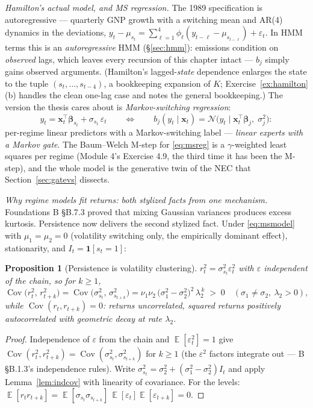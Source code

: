 \documentclass[11pt]{article}
\numberwithin{equation}{section}
\theoremstyle{plain}
\newtheorem{proposition}[theorem]{Proposition}
\theoremstyle{definition}
\theoremstyle{remark}
\DeclareMathOperator{\E}{\mathbb{E}}
\DeclareMathOperator{\Cov}{Cov}
\newcommand{\Normal}{\mathcal{N}}
\newcommand{\x}{\bm{x}}
\newcommand{\T}{\top}
\newcommand{\resp}{\gamma}
\begin{document}
\emph{Hamilton's actual model, and MS regression.} The 1989 specification is autoregressive --- quarterly GNP growth with a switching mean and AR(4) dynamics in the deviations, $y_t - \mu_{s_t} = \sum_{\ell=1}^{4} \phi_\ell (y_{t-\ell} - \mu_{s_{t-\ell}}) + \varepsilon_t$. In HMM terms this is an \emph{autoregressive} HMM (\S\ref{sec:hmm}): emissions condition on \emph{observed} lags, which leaves every recursion of this chapter intact --- $b_j$ simply gains observed arguments. (Hamilton's lagged-\emph{state} dependence enlarges the state to the tuple $(s_t, \dots, s_{t-4})$, a bookkeeping expansion of $K$; Exercise~\ref{ex:hamilton}(b) handles the clean one-lag case and notes the general bookkeeping.) The version the thesis cares about is \emph{Markov-switching regression}:
\begin{equation}
y_t = \x_t^\T \bm\beta_{s_t} + \sigma_{s_t}\, \varepsilon_t
\qquad\Longleftrightarrow\qquad
b_j(y_t \mid \x_t) = \Normal\big(y_t \mid \x_t^\T \bm\beta_j,\; \sigma_j^2\big):
\label{eq:msreg}
\end{equation}
per-regime linear predictors with a Markov-switching label --- \emph{linear experts with a Markov gate}. The Baum--Welch M-step for \eqref{eq:msreg} is a $\resp$-weighted least squares per regime (Module 4's Exercise 4.9, the third time it has been the M-step), and the whole model is the generative twin of the NEC that Section~\ref{sec:gatevs} dissects.

\emph{Why regime models fit returns: both stylized facts from one mechanism.} Foundations B \S B.7.3 proved that mixing Gaussian variances produces excess kurtosis. Persistence now delivers the second stylized fact. Under \eqref{eq:msmodel} with $\mu_1 = \mu_2 = 0$ (volatility switching only, the empirically dominant effect), stationarity, and $I_t = \mathbf{1}[s_t = 1]$:

\begin{proposition}[Persistence is volatility clustering]\label{prop:volclust}
$r_t^2 = \sigma_{s_t}^2 \varepsilon_t^2$ with $\varepsilon$ independent of the chain, so for $k \ge 1$,
\[
\Cov\big(r_t^2,\, r_{t+k}^2\big)
= \Cov\big(\sigma_{s_t}^2,\, \sigma_{s_{t+k}}^2\big)
= \nu_1 \nu_2\, \big(\sigma_1^2 - \sigma_2^2\big)^2\, \lambda_2^{\,k}
\;>\; 0
\quad (\sigma_1 \ne \sigma_2,\ \lambda_2 > 0),
\]
while $\Cov(r_t, r_{t+k}) = 0$: returns uncorrelated, squared returns positively autocorrelated with geometric decay at rate $\lambda_2$.
\end{proposition}
\begin{proof}
Independence of $\varepsilon$ from the chain and $\E[\varepsilon_t^2] = 1$ give $\Cov(r_t^2, r_{t+k}^2) = \Cov(\sigma^2_{s_t}, \sigma^2_{s_{t+k}})$ for $k \ge 1$ (the $\varepsilon^2$ factors integrate out --- B \S B.1.3's independence rules). Write $\sigma^2_{s_t} = \sigma_2^2 + (\sigma_1^2 - \sigma_2^2) I_t$ and apply Lemma~\ref{lem:indcov} with linearity of covariance. For the levels: $\E[r_t r_{t+k}] = \E[\sigma_{s_t}\sigma_{s_{t+k}}]\,\E[\varepsilon_t]\E[\varepsilon_{t+k}] = 0$.
\end{proof}
\end{document}
